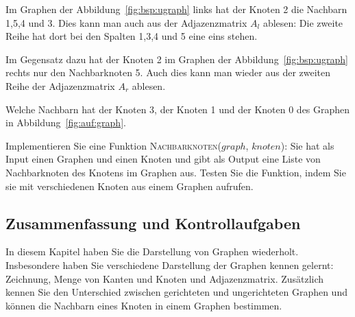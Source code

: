 \begin{mbsp}
Im Graphen der Abbildung~\ref{fig:bsp:ugraph} links hat der Knoten 2 die Nachbarn 1,5,4 und 3. 
Dies kann man auch aus der Adjazenzmatrix $A_l$ ablesen: Die zweite Reihe hat dort bei den Spalten 1,3,4 und 5 eine eins stehen.

Im Gegensatz dazu hat der Knoten 2 im Graphen der Abbildung~\ref{fig:bsp:ugraph} rechts nur den Nachbarknoten 5. 
Auch dies kann man wieder aus der zweiten Reihe der Adjazenzmatrix $A_r$ ablesen.
\end{mbsp}

\begin{aufg}
Welche Nachbarn hat der Knoten 3, der Knoten 1 und der Knoten 0 des Graphen in Abbildung~\ref{fig:auf:graph}.
\end{aufg}


\begin{aufg}
Implementieren Sie eine Funktion \textsc{Nachbarknoten($graph$, $knoten$)}: Sie hat als Input einen Graphen und einen Knoten und gibt als Output eine Liste von Nachbarknoten des Knotens im Graphen aus. Testen Sie die Funktion, indem Sie sie mit verschiedenen Knoten aus einem Graphen aufrufen.
\end{aufg}

\subsection{Zusammenfassung und Kontrollaufgaben}

In diesem Kapitel haben Sie die Darstellung von Graphen wiederholt. 
Insbesondere haben Sie verschiedene Darstellung der Graphen kennen gelernt: Zeichnung, Menge von Kanten und Knoten und Adjazenzmatrix.
Zusätzlich kennen Sie den Unterschied zwischen gerichteten und ungerichteten Graphen und können die Nachbarn eines Knoten in einem Graphen bestimmen. 



